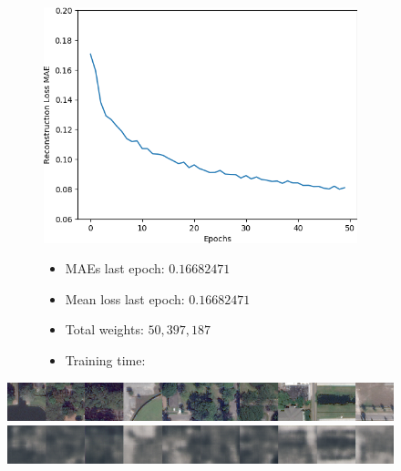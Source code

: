 \vspace{-3em}

\begin{figure}[H]
    \centering
    \begin{subfigure}{.5\textwidth}
        \centering
        \includegraphics[width=\textwidth]
        {images/figures/experiments_architecture/mae_graphKernel3adjusted2x2x256_dim1024.png}
    \end{subfigure}%
    \begin{subfigure}{.5\textwidth}
      \begin{itemize}
          \item MAEs last epoch: $0.16682471$
          \item Mean loss last epoch: $0.16682471$
          \item Total weights: $50,397,187$
          \item Training time:
      \end{itemize}
    \end{subfigure}
\end{figure}

\vspace{-2em}

\begin{figure}[H]
    \centering
    \includegraphics[width=\textwidth]
    {images/figures/experiments_architecture/inputsKernel3adjusted2x2x256_dim1024.png}
    \includegraphics[width=\textwidth]
    {images/figures/experiments_architecture/reconstructionsKernel3adjusted2x2x256_dim1024.png}
\end{figure}




